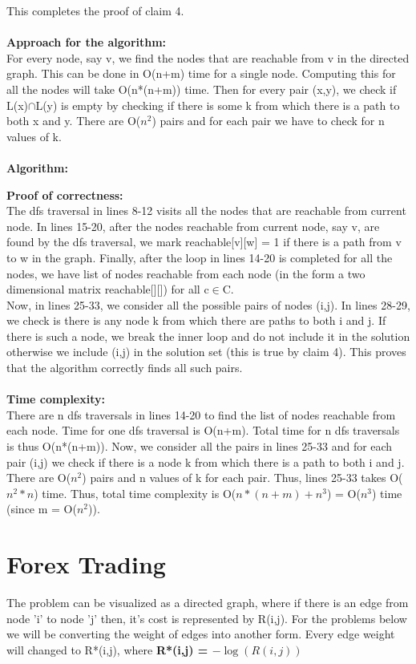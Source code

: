 \documentclass{article}
\begin{document}
This completes the proof of claim 4.\\
\\
\textbf{Approach for the algorithm:}
\\For every node, say v, we find the nodes that are reachable from v in the directed graph. This can be done in O(n+m) time for a single node. Computing this for all the nodes will take O(n*(n+m)) time. Then for every pair (x,y), we check if L(x)$\cap$L(y) is empty by checking if there is some k from which there is a path to both x and y. There are O($n^2$) pairs and for each pair we have to check for n values of k.
\\
\\
\textbf{Algorithm:}

\textbf{Proof of correctness:}\\
The dfs traversal in lines 8-12 visits all the nodes that are reachable from current node. In lines 15-20, after the nodes reachable from current node, say v, are found by the dfs traversal, we mark reachable[v][w] = 1 if there is a path from v to w in the graph. Finally, after the loop in lines 14-20 is completed for all the nodes, we have list of nodes reachable from each node (in the form a two dimensional matrix reachable[][]) for all c$\in$C.\\
Now, in lines 25-33, we consider all the possible pairs of nodes (i,j). In lines 28-29, we check is there is any node k from which there are paths to both i and j. If there is such a node, we break the inner loop and do not include it in the solution otherwise we include (i,j) in the solution set (this is true by claim 4). This proves that the algorithm correctly finds all such pairs.
\\
\\
\textbf{Time complexity:}\\
There are n dfs traversals in lines 14-20 to find the list of nodes reachable from each node. Time for one dfs traversal is O(n+m). Total time for n dfs traversals is thus O(n*(n+m)). Now, we consider all the pairs in lines 25-33 and for each pair (i,j) we check if there is a node k from which there is a path to both i and j. There are O($n^2$) pairs and n values of k for each pair. Thus, lines 25-33 takes O($n^{2}*n$) time. Thus, total time complexity is O($n*(n+m)+n^3$) = O($n^3$) time (since m = O($n^2$)).

\newpage
\section{Forex Trading}
The problem can be visualized as a directed graph, where if there is an edge from node 'i' to node 'j' then, it's cost is represented by R(i,j). For the problems below we will be converting the weight of edges into another form. Every edge weight will changed to R*(i,j), where \textbf{R*(i,j) = $-\log{(R(i,j))}$}
\end{document}
